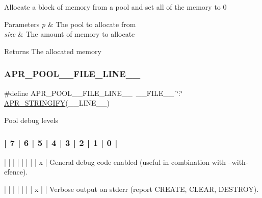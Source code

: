 Allocate a block of memory from a pool and set all of the memory to 0 
\begin{DoxyParams}{Parameters}
{\em p} & The pool to allocate from \\
\hline
{\em size} & The amount of memory to allocate \\
\hline
\end{DoxyParams}
\begin{DoxyReturn}{Returns}
The allocated memory 
\end{DoxyReturn}
\mbox{\label{group__apr__pools_gac81cff34d0ff4be52fa924663478eade}} 
\subsubsection{\texorpdfstring{A\+P\+R\+\_\+\+P\+O\+O\+L\+\_\+\+\_\+\+F\+I\+L\+E\+\_\+\+L\+I\+N\+E\+\_\+\+\_\+}{APR\_POOL\_\_FILE\_LINE\_\_}}
{\footnotesize\ttfamily \#define A\+P\+R\+\_\+\+P\+O\+O\+L\+\_\+\+\_\+\+F\+I\+L\+E\+\_\+\+L\+I\+N\+E\+\_\+\+\_\+~\+\_\+\+\_\+\+F\+I\+L\+E\+\_\+\+\_\+ \char`\"{}\+:\char`\"{} \mbox{\hyperlink{apr__version_8h_ae90215615972dfa4108018304361ef0b}{A\+P\+R\+\_\+\+S\+T\+R\+I\+N\+G\+I\+FY}}(\+\_\+\+\_\+\+L\+I\+N\+E\+\_\+\+\_\+)}

Pool debug levels


\begin{DoxyPre}
\subsubsection*{| 7 | 6 | 5 | 4 | 3 | 2 | 1 | 0 |
}\end{DoxyPre}



\begin{DoxyPre}
|   |   |   |   |   |   |   | x |  General debug code enabled (useful in
                                   combination with --with-efence).\end{DoxyPre}



\begin{DoxyPre}|   |   |   |   |   |   | x |   |  Verbose output on stderr (report
                                   CREATE, CLEAR, DESTROY).\end{DoxyPre}



